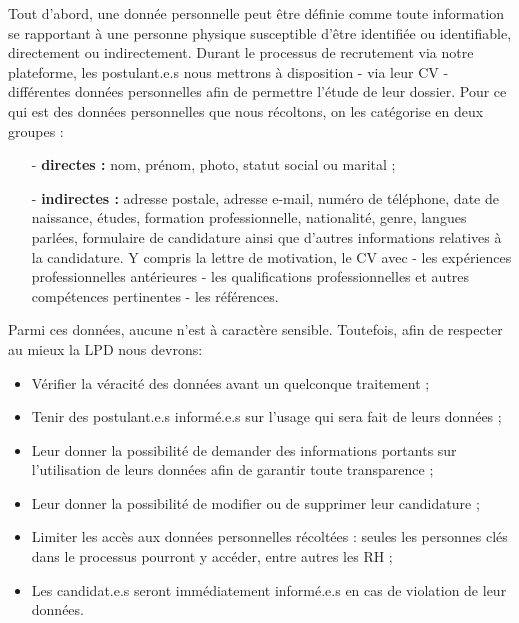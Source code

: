Tout d'abord, une donnée personnelle peut être définie comme toute information se rapportant à une personne physique susceptible d'être identifiée ou identifiable, directement ou indirectement.  Durant le processus de recrutement via notre plateforme, les postulant.e.s nous mettrons à disposition - via leur CV - différentes données personnelles afin de permettre l'étude de leur dossier. Pour ce qui est des données personnelles que nous récoltons, on les catégorise en deux groupes :\newline

\begin{enumerate}
\item[-] \textbf{directes :} nom, prénom, photo, statut social ou marital ; \\
\item[-] \textbf{indirectes :} adresse postale, adresse e-mail, numéro de téléphone, date de naissance, études, formation professionnelle, nationalité, genre, langues parlées, formulaire de candidature ainsi que d'autres informations relatives à la candidature. Y compris la lettre de motivation, le CV avec - les expériences professionnelles antérieures - les qualifications professionnelles et autres compétences pertinentes - les références.\\
\end{enumerate}

Parmi ces données, aucune n'est à caractère sensible. Toutefois, afin de respecter au mieux la LPD nous devrons:\newline

\begin{itemize}
    \item Vérifier la véracité des données avant un quelconque traitement ;\\
    \item Tenir des postulant.e.s informé.e.s sur l'usage qui sera fait de leurs données ;\\
    \item Leur donner la possibilité de demander des informations portants sur l'utilisation de leurs données afin de garantir toute transparence ;\\
    \item Leur donner la possibilité de modifier ou de supprimer leur candidature ;\\
    \item Limiter les accès aux données personnelles récoltées : seules les personnes clés dans le processus pourront y accéder, entre autres les RH ;\\
    \item Les candidat.e.s seront immédiatement informé.e.s en cas de violation de leur données. \\
\end{itemize}

